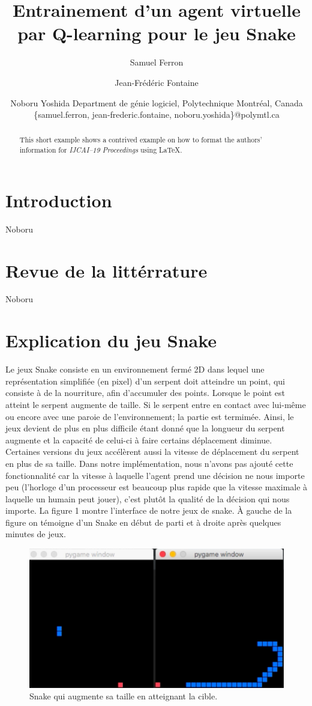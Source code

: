 \documentclass{article}
\title{Entrainement d'un agent virtuelle par Q-learning pour le jeu Snake}
\author{
Samuel Ferron\and
Jean-Frédéric Fontaine\and
Noboru Yoshida
\affiliations
Department de génie logiciel, Polytechnique Montréal, Canada\\
\emails
\{samuel.ferron, jean-frederic.fontaine, noboru.yoshida\}@polymtl.ca
}
\begin{document}
\maketitle

\begin{abstract}
This short example shows a contrived example on how to format the authors' information for {\it IJCAI--19 Proceedings} using \LaTeX{}.
\end{abstract}

\section{Introduction}

Noboru

\section{Revue de la littérrature}
 
Noboru

\section{Explication du jeu Snake }
Le jeux Snake consiste en un environnement fermé 2D dans lequel une représentation simplifiée (en pixel) d'un serpent doit atteindre un point, qui consiste à de la nourriture, afin d'accumuler des points. Lorsque le point est atteint le serpent augmente de taille. Si le serpent entre en contact avec lui-même ou encore avec une paroie de l'environnement; la partie est termimée. Ainsi, le jeux devient de plus en plus difficile étant donné que la longueur du serpent augmente et la capacité de celui-ci à faire certains déplacement diminue. Certaines versions du jeux accélèrent aussi la vitesse de déplacement du serpent en plus de sa taille. Dans notre implémentation, nous n'avons pas ajouté cette fonctionnalité car la vitesse à laquelle l'agent prend une décision ne nous importe peu (l'horloge d'un processeur est beaucoup plus rapide que la vitesse maximale à laquelle un humain peut jouer), c'est plutôt la qualité de la décision qui nous importe. La figure 1 montre l'interface de notre jeux de snake. À gauche de la figure on témoigne d'un Snake en début de parti et à droite après quelques minutes de jeux. 
\begin{figure}[ht]
\includegraphics[width=\linewidth]{snake.png}
\caption{Snake qui augmente sa taille en atteignant la cible.}
\label{fig:Snake}
\end{figure}
\end{document}
